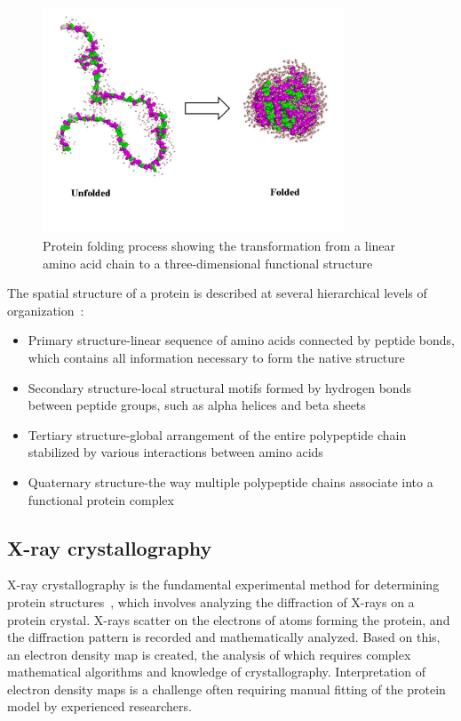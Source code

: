 \begin{figure}[htbp]
    \centering
    \includegraphics[width=0.8\textwidth]{images/folded.jpg}
    \caption{Protein folding process showing the transformation from a linear amino acid chain to a three-dimensional functional structure}
    \label{fig:protein-folding}
\end{figure}

The spatial structure of a protein is described at several hierarchical levels of organization~\cite{protein_folding, dill2012protein}:

\begin{itemize}
    \item Primary structure-linear sequence of amino acids connected by peptide bonds, which contains all information necessary to form the native structure
    \item Secondary structure-local structural motifs formed by hydrogen bonds between peptide groups, such as alpha helices and beta sheets
    \item Tertiary structure-global arrangement of the entire polypeptide chain stabilized by various interactions between amino acids
    \item Quaternary structure-the way multiple polypeptide chains associate into a functional protein complex
\end{itemize}

\subsection{X-ray crystallography}
X-ray crystallography is the fundamental experimental method for determining protein structures~\cite{xray_crystallography}, which involves analyzing the diffraction of X-rays on a protein crystal.
X-rays scatter on the electrons of atoms forming the protein, and the diffraction pattern is recorded and mathematically analyzed.
Based on this, an electron density map is created, the analysis of which requires complex mathematical algorithms and knowledge of crystallography.
Interpretation of electron density maps is a challenge often requiring manual fitting of the protein model by experienced researchers.

